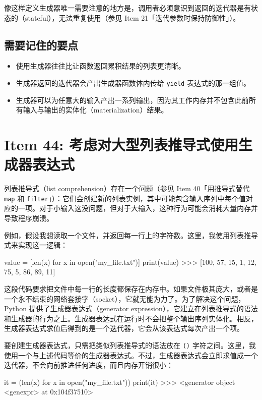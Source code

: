 像这样定义生成器唯一需要注意的地方是，调用者必须意识到返回的迭代器是有状态的（stateful），无法重复使用（参见 Item 21「迭代参数时保持防御性」）。

\subsection{需要记住的要点}

\begin{itemize}
\item 使用生成器往往比让函数返回累积结果的列表更清晰。
\item 生成器返回的迭代器会产出生成器函数体内传给 \texttt{yield} 表达式的那一组值。
\item 生成器可以为任意大的输入产出一系列输出，因为其工作内存并不包含此前所有输入与输出的实体化（materialization）结果。
\end{itemize}

\section{Item 44: 考虑对大型列表推导式使用生成器表达式}

列表推导式（list comprehension）存在一个问题（参见 Item 40「用推导式替代 \texttt{map} 和 \texttt{filter}」）：它们会创建新的列表实例，其中可能包含输入序列中每个值对应的一项。对于小输入这没问题，但对于大输入，这种行为可能会消耗大量内存并导致程序崩溃。

例如，假设我想读取一个文件，并返回每一行上的字符数。这里，我使用列表推导式来实现这一逻辑：

\begin{codebox}[python]
value = [len(x) for x in open("my_file.txt")]
print(value)
>>>
[100, 57, 15, 1, 12, 75, 5, 86, 89, 11]
\end{codebox}

这段代码要求把文件中每一行的长度都保存在内存中。如果文件极其庞大，或者是一个永不结束的网络套接字（socket），它就无能为力了。为了解决这个问题，Python 提供了生成器表达式（generator expression），它建立在列表推导式的语法和生成器的行为之上。生成器表达式在运行时不会把整个输出序列实体化。相反，生成器表达式求值后得到的是一个迭代器，它会从该表达式每次产出一个项。

要创建生成器表达式，只需把类似列表推导式的语法放在 \texttt{()} 字符之间。这里，我使用一个与上述代码等价的生成器表达式。不过，生成器表达式会立即求值成一个迭代器，不会向前推进任何进度，而且内存开销很小：

\begin{codebox}[python]
it = (len(x) for x in open("my_file.txt"))
print(it)
>>>
<generator object <genexpr> at 0x104f37510>
\end{codebox}

